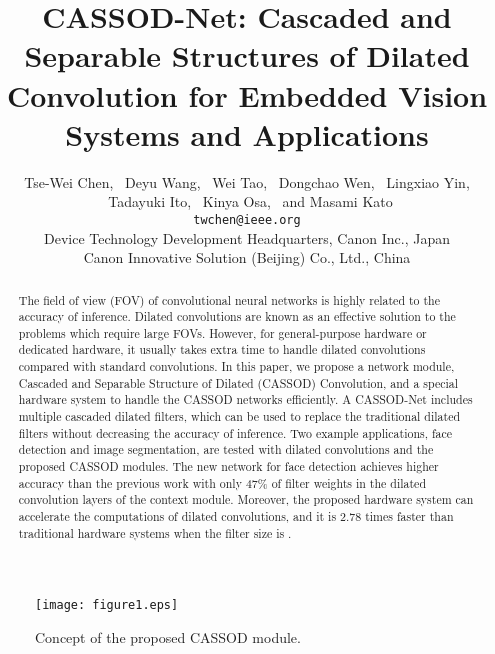 \documentclass[10pt,twocolumn,letterpaper]{article}
\begin{document}
\title{CASSOD-Net: Cascaded and Separable Structures of Dilated Convolution for Embedded Vision Systems and Applications}
\author{Tse-Wei Chen,
~Deyu Wang,
~Wei Tao,
~Dongchao Wen,
~Lingxiao Yin,\\
~Tadayuki Ito,
~Kinya Osa,
~and Masami Kato\\
{\tt\small twchen@ieee.org}\\
 Device Technology Development Headquarters, Canon Inc., Japan\\
 Canon Innovative Solution (Beijing) Co., Ltd., China\\
}





\maketitle
\thispagestyle{empty}

\begin{abstract}
The field of view (FOV) of convolutional neural networks is highly related to the accuracy of inference. Dilated convolutions are known as an effective solution to the problems which require large FOVs. However, for general-purpose hardware or dedicated hardware, it usually takes extra time to handle dilated convolutions compared with standard convolutions. In this paper, we propose a network module, Cascaded and Separable Structure of Dilated (CASSOD) Convolution, and a special hardware system to handle the CASSOD networks efficiently. A CASSOD-Net includes multiple cascaded  dilated filters, which can be used to replace the traditional  dilated filters without decreasing the accuracy of inference. Two example applications, face detection and image segmentation, are tested with dilated convolutions and the proposed CASSOD modules. The new network for face detection achieves higher accuracy than the previous work with only 47\% of filter weights in the dilated convolution layers of the context module. Moreover, the proposed hardware system can accelerate the computations of dilated convolutions, and it is 2.78 times faster than traditional hardware systems when the filter size is .
\end{abstract}



\begin{figure}[h]
\begin{center}
   \texttt{[image: figure1.eps]}
\end{center}
   \caption{Concept of the proposed CASSOD module.}
\label{fig:concept}
\end{figure}
\end{document}
